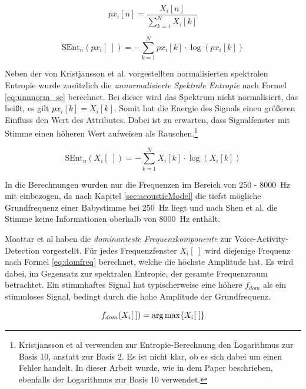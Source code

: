\begin{equation}
px_i[n] = \frac{X_i[n]}{\sum_{k=1}^{N} X_i[k]}
\label{eq:norm_spek}
\end{equation}

\begin{equation}
\text{SEnt}_n(px_i[\;]) = -\sum_{k=1}^{N}px_i[k] \cdot\log(px_i[k])
\label{eq:norm_se}
\end{equation}

Neben der von Kristjansson et al. \cite{vad_Lisboa} vorgestellten normalisierten spektralen Entropie wurde zusätzlich die \emph{unnormalisierte Spektrale Entropie} nach Formel \ref{eq:unnnorm_se} berechnet. Bei dieser wird das Spektrum nicht normalisiert, das heißt, es gilt $px_i[k] = X_i[k]$. Somit hat die Energie des Signals einen größeren Einfluss den Wert des Attributes. Dabei ist zu erwarten, dass Signalfenster mit Stimme einen höheren Wert aufweisen als Rauschen.\footnote{Kristjansson et al \cite[S. 2]{vad_Lisboa} verwenden zur Entropie-Berechnung den Logarithmus zur Basis 10, anstatt zur Basis 2. Es ist nicht klar, ob es sich dabei um einen Fehler handelt. In dieser Arbeit wurde, wie in dem Paper beschrieben, ebenfalls der Logarithmus zur Basis 10 verwendet.}

\begin{equation}
\text{SEnt}_u(X_i[\;]) = -\sum_{k=1}^{N}X_i[k] \cdot\log(X_i[k])
\label{eq:unnnorm_se}
\end{equation}

In die Berechnungen wurden nur die Frequenzen im Bereich von 250 - \SI{8000}{\hertz} mit einbezogen, da nach Kapitel \ref{sec:acousticModel} die tiefst mögliche Grundfrequenz einer Babystimme bei \SI{250}{\hertz} liegt und nach Shen et al. \cite{vad_entropie02} die Stimme keine Informationen oberhalb von \SI{8000}{\hertz} enthält.

Moattar et al \cite[S. 2550]{vad_Easy} haben die \emph{dominanteste Frequenzkomponente} zur Voice-Activity-Detection vorgestellt. Für jedes Frequenzfenster $X_i[\;]$ wird diejenige Frequenz nach Formel \ref{eq:domfreq} berechnet, welche die höchste Amplitude hat. Es wird dabei, im Gegensatz zur spektralen Entropie, der gesamte Frequenzraum betrachtet. Ein stimmhaftes Signal hat typischerweise eine höhere $f_{dom}$ als ein stimmloses Signal, bedingt durch die hohe Amplitude der Grundfrequenz.

\begin{equation}
f_{dom}(X_i[\;]) = \operatorname*{arg\,max} \{X_i[\;]\}
\label{eq:domfreq}
\end{equation}


